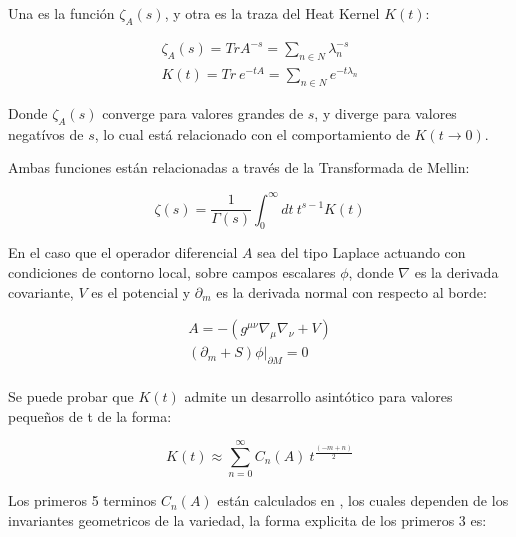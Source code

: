 Una es la función $ \zeta _A (s)$, y otra es la traza del Heat Kernel $K(t)$:

\begin{equation}
\begin{array}{c}
\zeta _A (s) = Tr A ^{-s} = \sum \limits_{n \in N}   \lambda _n ^{-s} \\[10pt]
K (t) =  Tr \ e ^{-t A} = \sum \limits_{n \in N} e ^{-t \lambda _{n} }
\end{array}
\label{funcion.zeta}
\end{equation}

Donde $\zeta _A (s) $ converge para valores grandes de $s$, y diverge para valores negatívos de $s$, lo cual está relacionado con el comportamiento de $K(t \rightarrow 0 )$. 


Ambas funciones están relacionadas a través de la Transformada de Mellin:




\begin{equation}
\zeta (s) = \frac{1}{\Gamma (s) } 
\int _0 ^{\infty} dt \
t ^{s-1} K(t) 
\end{equation}


En el caso que el operador diferencial $A$ sea del tipo Laplace actuando con condiciones de contorno local, sobre campos escalares $\phi $, donde $\nabla$ es la derivada covariante, $V$ es el potencial y $\partial _m$ es la derivada normal con respecto al borde:

\begin{equation}
\begin{array}{c}

A = - \left(
			g ^{\mu \nu} \nabla _{\mu} \nabla _{\nu} + V
			\right) \\
\left (\partial _m + S \right) \phi | _{\partial M} = 0 \\[10pt]

\end{array}
\end{equation}

Se puede probar que $K(t)$ admite un desarrollo asintótico para valores pequeños de t  de la forma:

\begin{equation}
K(t) \approx 
\sum _{n=0} ^{\infty}
C _n (A) \ 
t ^{\frac{(-m+n)}{2}} 
\label{eq.heat.expansion}
\end{equation}



Los primeros 5 terminos $C _n (A) $ están calculados en \cite{VASSILEVICH2003279}, los cuales dependen de los invariantes geometricos de la variedad, la forma explicita de los primeros 3 es: 

